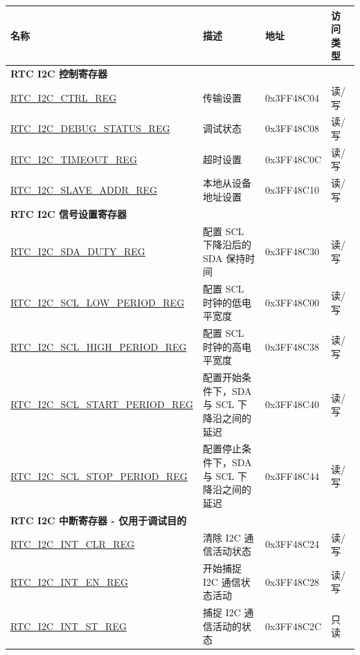 \begin{longtable}{ | m{6cm} | m{5.5cm} | m{2cm} | m{1.5cm} | }
    \hline\rowcolor{lightgray}
    名称 & 描述 &  地址 & 访问类型 \\ \hline
    \multicolumn{4}{|l|}{\textbf{RTC I2C 控制寄存器}} \\ \hline
    \hyperref[regdesc:RTCI2CCTRLREG]{RTC\_I2C\_CTRL\_REG} & 传输设置 & 0x3FF48C04 & 读/写 \\ \hline
    \hyperref[regdesc:RTCI2CDEBUGSTATUSREG]{RTC\_I2C\_DEBUG\_STATUS\_REG} & 调试状态 & 0x3FF48C08 & 读/写 \\ \hline
    \hyperref[regdesc:RTCI2CTIMEOUTREG]{RTC\_I2C\_TIMEOUT\_REG} & 超时设置 & 0x3FF48C0C & 读/写 \\ \hline
    \hyperref[regdesc:RTCI2CSLAVEADDRREG]{RTC\_I2C\_SLAVE\_ADDR\_REG} & 本地从设备地址设置 & 0x3FF48C10 & 读/写 \\ \hline
    \multicolumn{4}{|l|}{\textbf{RTC I2C 信号设置寄存器}} \\ \hline
    \hyperref[regdesc:RTCI2CSDADUTYREG]{RTC\_I2C\_SDA\_DUTY\_REG} & 配置 SCL 下降沿后的 SDA 保持时间 & 0x3FF48C30 & 读/写 \\ \hline
    \hyperref[regdesc:RTCI2CSCLLOWPERIODREG]{RTC\_I2C\_SCL\_LOW\_PERIOD\_REG} & 配置 SCL 时钟的低电平宽度 & 0x3FF48C00 & 读/写 \\ \hline
    \hyperref[regdesc:RTCI2CSCLLOWPERIODREG]{RTC\_I2C\_SCL\_HIGH\_PERIOD\_REG} & 配置 SCL 时钟的高电平宽度 & 0x3FF48C38 & 读/写 \\ \hline
    \hyperref[regdesc:RTCI2CSCLSTARTPERIODREG]{RTC\_I2C\_SCL\_START\_PERIOD\_REG} & 配置开始条件下，SDA 与 SCL 下降沿之间的延迟 & 0x3FF48C40 & 读/写 \\ \hline
    
    \hyperref[regdesc:RTCI2CSCLSTOPPERIODREG]{RTC\_I2C\_SCL\_STOP\_PERIOD\_REG} & 配置停止条件下，SDA 与 SCL 下降沿之间的延迟 & 0x3FF48C44 & 读/写 \\ \hline
    \multicolumn{4}{|l|}{\textbf{RTC I2C 中断寄存器 - 仅用于调试目的}} \\ \hline
    \hyperref[regdesc:RTCI2CINTCLRREG]{RTC\_I2C\_INT\_CLR\_REG} & 清除 I2C 通信活动状态 & 0x3FF48C24 & 读/写 \\ \hline
    \hyperref[regdesc:RTCI2CINTENREG]{RTC\_I2C\_INT\_EN\_REG} & 开始捕捉 I2C 通信状态活动 & 0x3FF48C28 & 读/写 \\ \hline
    \hyperref[regdesc:RTCI2CINTSTREG]{RTC\_I2C\_INT\_ST\_REG} & 捕捉 I2C 通信活动的状态 & 0x3FF48C2C & 只读 \\ \hline
    \end{longtable}

